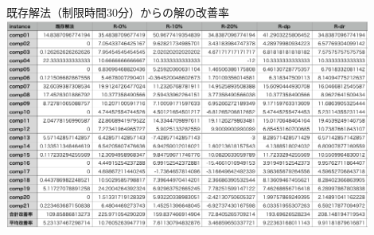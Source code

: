 \documentclass[11pt,dvipdfmx]{beamer}
\begin{document}
\begin{frame}{既存解法（制限時間30分）からの解の改善率}
  \centering
 \includegraphics[width=12cm]{pic/improve.png}
\end{frame}
\end{document}
